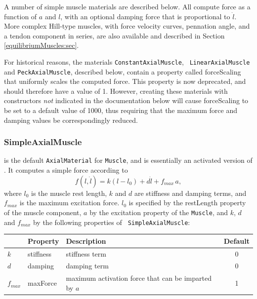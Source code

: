 A number of simple muscle materials are described below. All compute
force as a function of $a$ and $l$, with an optional damping force
that is proportional to $\dot l$. More complex Hill-type muscles, with
force velocity curves, pennation angle, and a tendon component in
series, are also available and described in
Section \ref{equilibriumMuscles:sec}.

\begin{sideblock}
For historical reasons, the materials {\tt ConstantAxialMuscle}, {\tt
LinearAxialMuscle} and {\tt PeckAxialMuscle}, described below, contain
a property called {\sf forceScaling} that uniformly scales the
computed force. This property is now deprecated, and should therefore
have a value of 1. However, creating these materials with constructors
{\it not} indicated in the documentation below will cause {\sf
forceScaling} to be set to a default value of 1000, thus requiring
that the maximum force and damping values be correspondingly reduced.
\end{sideblock}

\subsubsection{SimpleAxialMuscle}

 is the default
{\tt AxialMaterial} for {\tt Muscle}, and is essentially an activated
version of .
It computes a simple force according to
%
\begin{equation}
f(l, \dot l) = k (l-l_0) + d \dot l + f_{max} \, a,
\label{SimpleAxialMuscle:eqn}
\end{equation}
%
where $l_0$ is the muscle rest length, $k$ and $d$ are stiffness and
damping terms, and $f_{max}$ is the maximum excitation force. $l_0$ is
specified by the {\sf restLength} property of the muscle component,
$a$ by the {\sf excitation} property of the {\tt Muscle}, and $k$, $d$
and $f_{max}$ by the following properties of {\tt
SimpleAxialMuscle}:

\begin{center}
\begin{tabular}{|l|l|l|c|} 
\hline
 & Property & Description & Default \\
\hline
$k$ & {\sf stiffness} & stiffness term & 0 \\
$d$ & {\sf damping} & damping term & 0 \\
$f_{max}$ & {\sf maxForce} & maximum activation force that can be 
imparted by $a$ & 1 \\
\hline
\end{tabular}
\end{center}

